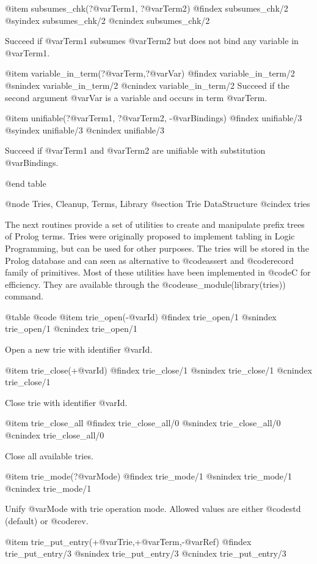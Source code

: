 @item subsumes_chk(?@var{Term1}, ?@var{Term2})
@findex  subsumes_chk/2
@syindex subsumes_chk/2
@cnindex subsumes_chk/2

Succeed if @var{Term1} subsumes @var{Term2} but does not bind any
variable in @var{Term1}.

@item variable_in_term(?@var{Term},?@var{Var})
@findex variable_in_term/2
@snindex variable_in_term/2
@cnindex variable_in_term/2
Succeed if the second argument @var{Var} is a variable and occurs in
term @var{Term}.

@item unifiable(?@var{Term1}, ?@var{Term2}, -@var{Bindings})
@findex  unifiable/3
@syindex unifiable/3
@cnindex unifiable/3

Succeed if @var{Term1} and @var{Term2} are unifiable with substitution
@var{Bindings}.

@end table

@node Tries, Cleanup, Terms, Library
@section Trie DataStructure
@cindex tries

The next routines provide a set of utilities to create and manipulate
prefix trees of Prolog terms. Tries were originally proposed to
implement tabling in Logic Programming, but can be used for other
purposes. The tries will be stored in the Prolog database and can seen
as alternative to @code{assert} and @code{record} family of
primitives. Most of these utilities have been implemented in @code{C}
for efficiency. They are available through the
@code{use_module(library(tries))} command.

@table @code
@item trie_open(-@var{Id})
@findex trie_open/1
@snindex trie_open/1
@cnindex trie_open/1

Open a new trie with identifier @var{Id}.

@item trie_close(+@var{Id})
@findex trie_close/1
@snindex trie_close/1
@cnindex trie_close/1

Close trie with identifier @var{Id}.

@item trie_close_all
@findex trie_close_all/0
@snindex trie_close_all/0
@cnindex trie_close_all/0

Close all available tries.

@item trie_mode(?@var{Mode})
@findex trie_mode/1
@snindex trie_mode/1
@cnindex trie_mode/1

Unify @var{Mode} with trie operation mode. Allowed values are either
@code{std} (default) or @code{rev}.

@item trie_put_entry(+@var{Trie},+@var{Term},-@var{Ref})
@findex trie_put_entry/3
@snindex trie_put_entry/3
@cnindex trie_put_entry/3

